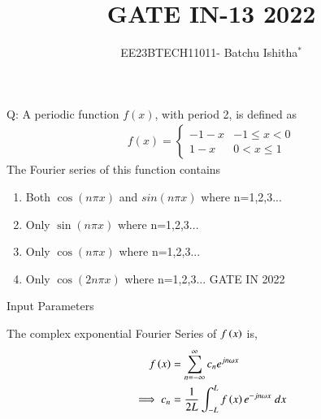 \documentclass[journal,12pt,onecolumn]{IEEEtran}
\theoremstyle{remark}
\begin{document}
\let\vec\mathbf



\title{ GATE IN-13 2022}
\author{EE23BTECH11011- Batchu Ishitha$^{*}$%
}
\maketitle




\bigskip

\renewcommand{\thefigure}{\theenumi}
\renewcommand{\thetable}{\theenumi}

Q: A periodic function $f(x)$, with period 2, is defined as \\
   \begin{align}   
   f(x) =
   \begin{cases}
    -1-x & -1 \leq x<0 \\
     1-x &  0 <x \leq1 
   \end{cases}
   \end{align} 
   The Fourier series of this function contains \\
\begin{enumerate}[label=\Alph*.]
\item Both $\cos(n\pi x)$ and $sin(n\pi x)$ where n=1,2,3...
\item Only $\sin(n\pi x)$ where n=1,2,3...
\item Only $\cos(n\pi x)$ where n=1,2,3...
\item Only $\cos(2n\pi x)$ where n=1,2,3...  \hfill{GATE IN 2022 }
\end{enumerate} 

\solution

\begin{table}[!ht]    
    \centering
    
    \caption{Input Parameters}
    \label{table:ishitha.g22.in.13.t1}
\end{table}

The complex exponential Fourier Series of $f\left(x\right)$ is,
\begin{align}
    f\left(x\right)&=\sum_{n=-\infty}^{\infty}c_ne^{jn\omega x}\\
    \implies c_n&=\frac{1}{2L}\int_{-L}^{L}f\left(x\right)e^{-jn\omega x}\;dx\\
\end{align}    
\end{document}
